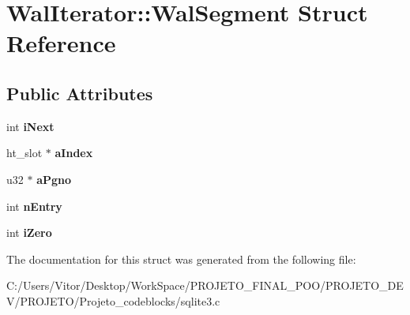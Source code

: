 \hypertarget{struct_wal_iterator_1_1_wal_segment}{\section{Wal\-Iterator\-:\-:Wal\-Segment Struct Reference}
\label{struct_wal_iterator_1_1_wal_segment}
}
\subsection*{Public Attributes}
\begin{DoxyCompactItemize}
\item 
\hypertarget{struct_wal_iterator_1_1_wal_segment_a329c939b196f907fe98cf762bb07d291}{int {\bfseries i\-Next}}\label{struct_wal_iterator_1_1_wal_segment_a329c939b196f907fe98cf762bb07d291}

\item 
\hypertarget{struct_wal_iterator_1_1_wal_segment_adec397836a127acafcc551cb1fdcd851}{ht\-\_\-slot $\ast$ {\bfseries a\-Index}}\label{struct_wal_iterator_1_1_wal_segment_adec397836a127acafcc551cb1fdcd851}

\item 
\hypertarget{struct_wal_iterator_1_1_wal_segment_a5e43273a11dc5856934834c0cdf7f198}{u32 $\ast$ {\bfseries a\-Pgno}}\label{struct_wal_iterator_1_1_wal_segment_a5e43273a11dc5856934834c0cdf7f198}

\item 
\hypertarget{struct_wal_iterator_1_1_wal_segment_ad80cf479aa670eda7aa1adee607af7d9}{int {\bfseries n\-Entry}}\label{struct_wal_iterator_1_1_wal_segment_ad80cf479aa670eda7aa1adee607af7d9}

\item 
\hypertarget{struct_wal_iterator_1_1_wal_segment_a3eedec5e8e8dd94be670d50ac144a959}{int {\bfseries i\-Zero}}\label{struct_wal_iterator_1_1_wal_segment_a3eedec5e8e8dd94be670d50ac144a959}

\end{DoxyCompactItemize}


The documentation for this struct was generated from the following file\-:\begin{DoxyCompactItemize}
\item 
C\-:/\-Users/\-Vitor/\-Desktop/\-Work\-Space/\-P\-R\-O\-J\-E\-T\-O\-\_\-\-F\-I\-N\-A\-L\-\_\-\-P\-O\-O/\-P\-R\-O\-J\-E\-T\-O\-\_\-\-D\-E\-V/\-P\-R\-O\-J\-E\-T\-O/\-Projeto\-\_\-codeblocks/sqlite3.\-c\end{DoxyCompactItemize}
